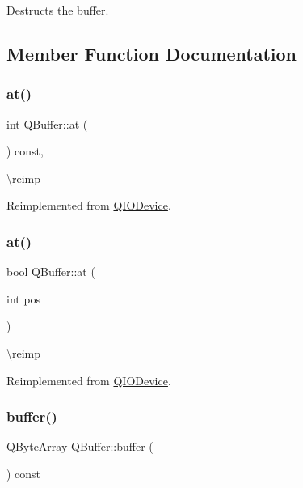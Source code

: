 Destructs the buffer. 

\subsection{Member Function Documentation}
\mbox{\label{class_q_buffer_adbff1cb0375ac6bc27621d26450c6c0a}} 
\subsubsection{\texorpdfstring{at()}{at()}\hspace{0.1cm}{\footnotesize\ttfamily [1/2]}}
{\footnotesize\ttfamily int Q\+Buffer\+::at (\begin{DoxyParamCaption}{ }\end{DoxyParamCaption}) const\hspace{0.3cm}{\ttfamily [inline]}, {\ttfamily [virtual]}}

\textbackslash{}reimp 

Reimplemented from \mbox{\hyperlink{class_q_i_o_device_a0dee1db4a9e506924ccac6982ffdf3df}{Q\+I\+O\+Device}}.

\mbox{\label{class_q_buffer_a4b4cd4e092b55db973fa34f76403b65d}} 
\subsubsection{\texorpdfstring{at()}{at()}\hspace{0.1cm}{\footnotesize\ttfamily [2/2]}}
{\footnotesize\ttfamily bool Q\+Buffer\+::at (\begin{DoxyParamCaption}\item[{int}]{pos }\end{DoxyParamCaption})\hspace{0.3cm}{\ttfamily [virtual]}}

\textbackslash{}reimp 

Reimplemented from \mbox{\hyperlink{class_q_i_o_device_a14643fc1c2e05c2addd1ecc03bd98017}{Q\+I\+O\+Device}}.

\mbox{\label{class_q_buffer_a4f369e95bc73a6141f1616824ea79470}} 
\subsubsection{\texorpdfstring{buffer()}{buffer()}}
{\footnotesize\ttfamily \mbox{\hyperlink{class_q_array}{Q\+Byte\+Array}} Q\+Buffer\+::buffer (\begin{DoxyParamCaption}{ }\end{DoxyParamCaption}) const\hspace{0.3cm}{\ttfamily [inline]}}

